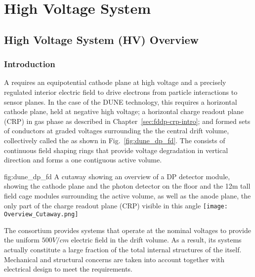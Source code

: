 \chapter{High Voltage System}
\label{ch:fddp-hv}

\section{High Voltage System (HV) Overview}
\label{sec:fddp-hv-ov}


\subsection{Introduction}
\label{sec:fddp-hv-intro}

A  requires an equipotential cathode plane at high voltage and a precisely regulated interior electric field to drive 
electrons from particle interactions to sensor planes.  In the case of the DUNE  technology, 
this requires a horizontal cathode plane, held at negative high voltage; a horizontal charge readout plane (CRP) in gas phase as described in  Chapter~\ref{sec:fddp-crp-intro}; and formed sets of conductors at graded voltages surrounding the
 the central drift volume, collectively called the  as shown in Fig.~\ref{fig:dune_dp_fd}. The  consists of continuous field shaping rings that provide voltage degradation in vertical direction and forms a one contiguous active volume.


\begin{dunefigure}[A DP Overview]{fig:dune_dp_fd}
{A cutaway showing an overview of a DP detector module, showing the cathode plane and the photon detector on the floor and the 12m tall field cage modules surrounding the active volume, as well as the anode plane, the only part of the charge readout plane (CRP) visible in this angle}
\texttt{[image: Overview\_Cutaway.png]}
\end{dunefigure}


The  consortium provides systems that operate at the nominal voltages to provide the uniform $500V/cm$ electric field in the  drift volume. As a result, its systems actually constitute a large fraction of the total internal structures of the  itself. Mechanical and structural concerns are taken into account together with electrical design to meet the requirements. 

